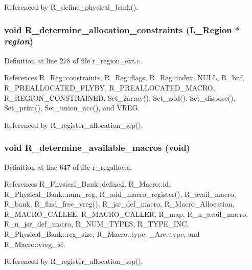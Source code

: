 Referenced by R\_\-define\_\-physical\_\-bank().
\subsubsection{\setlength{\rightskip}{0pt plus 5cm}void R\_\-determine\_\-allocation\_\-constraints (L\_\-Region $\ast$ {\em region})}\label{r__regproto_8h_ec5de6779afaf6c23006d8a5363992dc}




Definition at line 278 of file r\_\-region\_\-ext.c.

References R\_\-Reg::constraints, R\_\-Reg::flags, R\_\-Reg::index, NULL, R\_\-buf, R\_\-PREALLOCATED\_\-FLYBY, R\_\-PREALLOCATED\_\-MACRO, R\_\-REGION\_\-CONSTRAINED, Set\_\-2array(), Set\_\-add(), Set\_\-dispose(), Set\_\-print(), Set\_\-union\_\-acc(), and VREG.

Referenced by R\_\-register\_\-allocation\_\-sep().
\subsubsection{\setlength{\rightskip}{0pt plus 5cm}void R\_\-determine\_\-available\_\-macros (void)}\label{r__regproto_8h_268621ded44a6e33e4f2dcffc50fab76}




Definition at line 647 of file r\_\-regalloc.c.

References R\_\-Physical\_\-Bank::defined, R\_\-Macro::id, R\_\-Physical\_\-Bank::num\_\-reg, R\_\-add\_\-macro\_\-register(), R\_\-avail\_\-macro, R\_\-bank, R\_\-find\_\-free\_\-vreg(), R\_\-jsr\_\-def\_\-macro, R\_\-Macro\_\-Allocation, R\_\-MACRO\_\-CALLEE, R\_\-MACRO\_\-CALLER, R\_\-map, R\_\-n\_\-avail\_\-macro, R\_\-n\_\-jsr\_\-def\_\-macro, R\_\-NUM\_\-TYPES, R\_\-TYPE\_\-INC, R\_\-Physical\_\-Bank::reg\_\-size, R\_\-Macro::type, \_\-Arc::type, and R\_\-Macro::vreg\_\-id.

Referenced by R\_\-register\_\-allocation\_\-sep().
